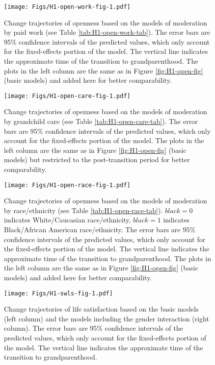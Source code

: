 \documentclass[
  english,
  man,floatsintext]{apa7}
\begin{document}
\begin{figure}
\centering
\texttt{[image: Figs/H1-open-work-fig-1.pdf]}
\caption{\label{fig:H1-open-work-fig}Change trajectories of openness based on the models of moderation by paid work (see Table \ref{tab:H1-open-work-tab}). The error bars are 95\% confidence intervals of the predicted values, which only account for the fixed-effects portion of the model. The vertical line indicates the approximate time of the transition to grandparenthood. The plots in the left column are the same as in Figure \ref{fig:H1-open-fig} (basic models) and added here for better comparability.}
\end{figure}



\begin{figure}
\centering
\texttt{[image: Figs/H1-open-care-fig-1.pdf]}
\caption{\label{fig:H1-open-care-fig}Change trajectories of openness based on the models of moderation by grandchild care (see Table \ref{tab:H1-open-care-tab}). The error bars are 95\% confidence intervals of the predicted values, which only account for the fixed-effects portion of the model. The plots in the left column are the same as in Figure \ref{fig:H1-open-fig} (basic models) but restricted to the post-transition period for better comparability.}
\end{figure}



\begin{figure}
\centering
\texttt{[image: Figs/H1-open-race-fig-1.pdf]}
\caption{\label{fig:H1-open-race-fig}Change trajectories of openness based on the models of moderation by race/ethnicity (see Table \ref{tab:H1-open-race-tab}). \(black=0\) indicates White/Caucasian race/ethnicity, \(black=1\) indicates Black/African American race/ethnicity. The error bars are 95\% confidence intervals of the predicted values, which only account for the fixed-effects portion of the model. The vertical line indicates the approximate time of the transition to grandparenthood. The plots in the left column are the same as in Figure \ref{fig:H1-open-fig} (basic models) and added here for better comparability.}
\end{figure}



\begin{figure}
\centering
\texttt{[image: Figs/H1-swls-fig-1.pdf]}
\caption{\label{fig:H1-swls-fig}Change trajectories of life satisfaction based on the basic models (left column) and the models including the gender interaction (right column). The error bars are 95\% confidence intervals of the predicted values, which only account for the fixed-effects portion of the model. The vertical line indicates the approximate time of the transition to grandparenthood.}
\end{figure}
\end{document}
